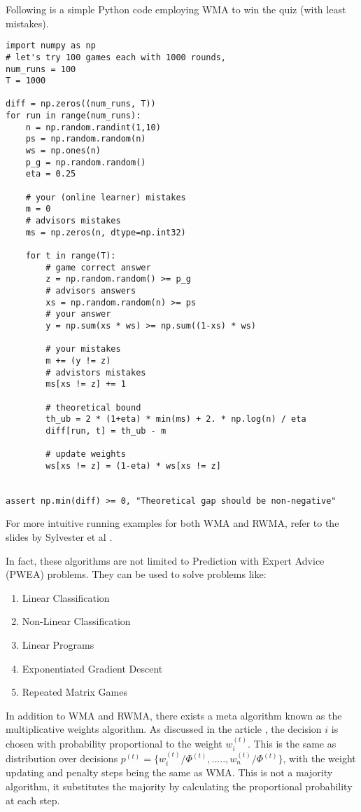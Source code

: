 \documentclass[11pt]{article}
\begin{document}
Following is a simple Python code \cite{code} employing WMA to win the quiz (with least mistakes). 

\begin{lstlisting}
import numpy as np
# let's try 100 games each with 1000 rounds,  
num_runs = 100
T = 1000

diff = np.zeros((num_runs, T))
for run in range(num_runs):
    n = np.random.randint(1,10)
    ps = np.random.random(n)
    ws = np.ones(n)
    p_g = np.random.random()
    eta = 0.25

    # your (online learner) mistakes
    m = 0
    # advisors mistakes
    ms = np.zeros(n, dtype=np.int32)

    for t in range(T):
        # game correct answer
        z = np.random.random() >= p_g
        # advisors answers
        xs = np.random.random(n) >= ps
        # your answer
        y = np.sum(xs * ws) >= np.sum((1-xs) * ws)

        # your mistakes
        m += (y != z)
        # advistors mistakes
        ms[xs != z] += 1

        # theoretical bound
        th_ub = 2 * (1+eta) * min(ms) + 2. * np.log(n) / eta
        diff[run, t] = th_ub - m
        
        # update weights
        ws[xs != z] = (1-eta) * ws[xs != z]


assert np.min(diff) >= 0, "Theoretical gap should be non-negative"
\end{lstlisting}


For more intuitive running examples for both WMA and RWMA, refer to the slides by Sylvester et al \cite{pdf}.

In fact, these algorithms are not limited to Prediction with Expert Advice (PWEA) problems. They can be used to solve problems like:
\begin{enumerate}
    \item Linear Classification
    \item Non-Linear Classification
    \item Linear Programs
    \item Exponentiated Gradient Descent
    \item Repeated Matrix Games
\end{enumerate}





In addition to WMA and RWMA, there exists a meta algorithm known as the multiplicative weights algorithm. As discussed in the article \cite{MWA}, the decision $i$ is chosen with probability proportional to the weight $w_i^{(t)}$. This is the same as distribution over decisions $p^{(t)}=\{w_i^{(t)}/\Phi^{(t)},.....,w_n^{(t)}/\Phi^{(t)}\}$, with the weight updating and penalty steps being the same as WMA. This is not a majority algorithm, it substitutes the majority by calculating the proportional probability at each step.
\\
\end{document}
